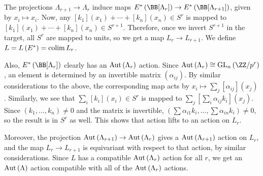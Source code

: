 The projections $\Lambda_{r+1} \to \Lambda_r$ induce maps $E^*\left(\BB[\Lambda_r]\right) \to E^*\left(\BB[\Lambda_{r+1}]\right)$, given by $x_i \mapsto x_i$.
Now, any $[k_1]\left(x_1\right) + \cdots + [k_n]\left(x_n\right) \in S^r$ is mapped to $[k_1]\left(x_1\right) + \cdots + [k_n]\left(x_n\right) \in S^{r+1}$.
Therefore, once we invert $S^{r+1}$ in the target, all $S^r$ are mapped to units, so we get a map $L_r \to L_{r+1}$.
We define $L = L\left(E^*\right) = \operatorname{colim} L_r$.

Also, $E^*\left(\BB[\Lambda_r]\right)$ clearly has an $\operatorname{Aut}\left(\Lambda_r\right)$ action.
Since $\aut\left(\Lambda_r\right) \cong \GL_n\left(\ZZ/{p^r}\right)$, an element is determined by an invertible matrix $\left(\alpha_{ij}\right)$.
By similar considerations to the above, the corresponding map acts by $x_i \mapsto \sum_j \left[\alpha_{ij}\right]\left(x_j\right)$.
Similarly, we see that $\sum_i [k_i]\left(x_i\right) \in S^r$ is mapped to $\sum_j \left[\sum_i  \alpha_{ij}k_i\right]\left(x_j\right)$. 
Since $\left(k_1, \dotsc, k_n\right) \neq 0$ and the matrix is invertible, $\left(\sum \alpha_{i1} k_i, \dotsc, \sum \alpha_{in} k_i\right) \neq 0$, so the result is in $S^r$ as well.
This shows that action lifts to an action on $L_r$.

Moreover, the projection $\operatorname{Aut}\left(\Lambda_{r+1}\right) \to \operatorname{Aut}\left(\Lambda_r\right)$ gives a $\operatorname{Aut}\left(\Lambda_{r+1}\right)$ action on $L_r$, and the map $L_r \to L_{r+1}$ is equivariant with respect to that action, by similar considerations. 
Since $L$ has a compatible $\operatorname{Aut}\left(\Lambda_r\right)$ action for all $r$, we get an $\operatorname{Aut}\left(\Lambda\right)$ action compatible with all of the $\operatorname{Aut}\left(\Lambda_r\right)$ actions.

